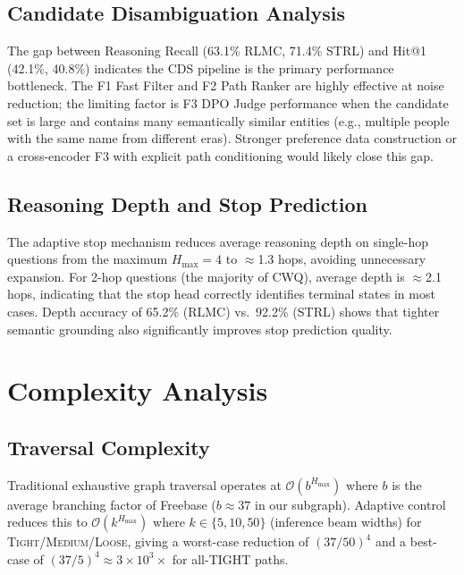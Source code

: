 \documentclass[10pt,conference]{IEEEtran}
\begin{document}
\subsection{Candidate Disambiguation Analysis}

The gap between Reasoning Recall (63.1\% RLMC, 71.4\% STRL) and Hit@1 (42.1\%, 40.8\%) indicates the CDS pipeline is the primary performance bottleneck. The F1 Fast Filter and F2 Path Ranker are highly effective at noise reduction; the limiting factor is F3 DPO Judge performance when the candidate set is large and contains many semantically similar entities (e.g., multiple people with the same name from different eras). Stronger preference data construction or a cross-encoder F3 with explicit path conditioning would likely close this gap.

\subsection{Reasoning Depth and Stop Prediction}

The adaptive stop mechanism reduces average reasoning depth on single-hop questions from the maximum $H_{\max}=4$ to $\approx$1.3 hops, avoiding unnecessary expansion. For 2-hop questions (the majority of CWQ), average depth is $\approx$2.1 hops, indicating that the stop head correctly identifies terminal states in most cases. Depth accuracy of 65.2\% (RLMC) vs.\ 92.2\% (STRL) shows that tighter semantic grounding also significantly improves stop prediction quality.

\section{Complexity Analysis}
\label{app:complexity}

\subsection{Traversal Complexity}

Traditional exhaustive graph traversal operates at $\mathcal{O}(b^{H_{\max}})$ where $b$ is the average branching factor of Freebase ($b \approx 37$ in our subgraph). Adaptive control reduces this to $\mathcal{O}(k^{H_{\max}})$ where $k \in \{5, 10, 50\}$ (inference beam widths) for \textsc{Tight}/\textsc{Medium}/\textsc{Loose}, giving a worst-case reduction of $(37/50)^4$ and a best-case of $(37/5)^4 \approx 3 \times 10^3\times$ for all-TIGHT paths.
\end{document}
